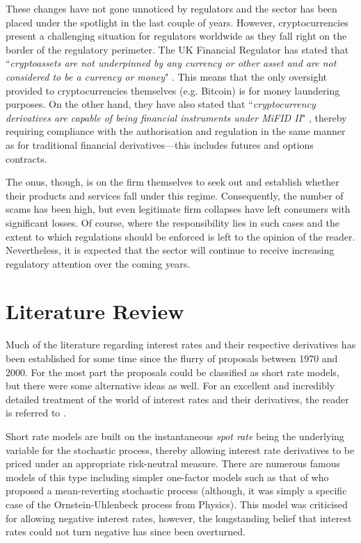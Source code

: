 These changes have not gone unnoticed by regulators and the sector has been placed under the spotlight in the last couple of years. However, cryptocurrencies present a challenging situation for regulators worldwide as they fall right on the border of the regulatory perimeter. The UK Financial Regulator has stated that ``\textit{cryptoassets are not underpinned by any currency or other asset and are not considered to be a currency or money}" \citep{FCA_Ch2_3}. This means that the only oversight provided to cryptocurrencies themselves (e.g. Bitcoin) is for money laundering purposes. On the other hand, they have also stated that ``\textit{cryptocurrency derivatives are capable of being financial instruments under MiFID II}" \citep{FCA_Ch2_4}, thereby requiring compliance with the authorisation and regulation in the same manner as for traditional financial derivatives––this includes futures and options contracts. 

The onus, though, is on the firm themselves to seek out and establish whether their products and services fall under this regime. Consequently, the number of scams has been high, but even legitimate firm collapses have left consumers with significant losses. Of course, where the responsibility lies in such cases and the extent to which regulations should be enforced is left to the opinion of the reader. Nevertheless, it is expected that the sector will continue to receive increasing regulatory attention over the coming years.



\section{Literature Review}
Much of the literature regarding interest rates and their respective derivatives has been established for some time since the flurry of proposals between 1970 and 2000. For the most part the proposals could be classified as short rate models, but there were some alternative ideas as well. For an excellent and incredibly detailed treatment of the world of interest rates and their derivatives, the reader is referred to \cite{brigo2001interest}.

Short rate models are built on the instantaneous \textit{spot rate} being the underlying variable for the stochastic process, thereby allowing interest rate derivatives to be priced under an appropriate risk-neutral measure. There are numerous famous models of this type including simpler one-factor models such as that of \cite{vasicek1977equilibrium} who proposed a mean-reverting stochastic process (although, it was simply a specific case of the Ornstein-Uhlenbeck process from Physics). This model was criticised for allowing negative interest rates, however, the longstanding belief that interest rates could not turn negative has since been overturned.

